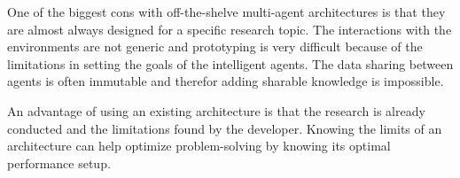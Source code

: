 One of the biggest cons with off-the-shelve multi-agent architectures is that they are almost
always designed for a specific research topic. The interactions with the environments are
not generic and prototyping is very difficult because of the limitations in setting the goals
of the intelligent agents. The data sharing between agents is often immutable and therefor
adding sharable knowledge is impossible.

An advantage of using an existing architecture is that the research is already conducted
and the limitations found by the developer. Knowing the limits of an architecture can help
optimize problem-solving by knowing its optimal performance setup.